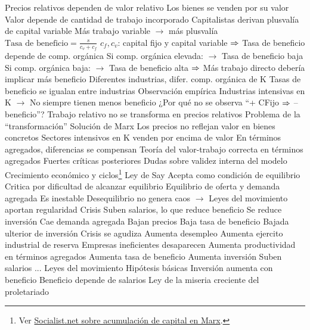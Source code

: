 \documentclass{nuevotema}
\begin{document}
\begin{esquemal}
				\4[i] Precios relativos dependen de valor relativo
				\4[] Los bienes se venden por su valor
				\4[] Valor depende de cantidad de trabajo incorporado
				\4[ii] Capitalistas derivan plusvalía de capital variable
				\4[] Más trabajo variable $\to$ más plusvalía
				\4[] $\text{Tasa de beneficio} = \frac{s}{c_v+c_f}$
				\4[] $c_f, c_v$: capital fijo y capital variable
				\4[] $\then$ Tasa de beneficio depende de comp. orgánica
				\4[] Si comp. orgánica elevada:
				\4[] $\to$ Tasa de beneficio baja
				\4[] Si comp. orgánica baja:
				\4[] $\to$ Tasa de beneficio alta
				\4[] $\then$ Más trabajo directo debería implicar más beneficio
				\4[iii] Diferentes industrias, difer. comp. orgánica de K
				\4[iv] Tasas de beneficio se igualan entre industrias
				\4[] Observación empírica
				\4[] Industrias intensivas en K
				\4[] $\to$ No siempre tienen menos beneficio
				\4[$\to$] ¿Por qué no se observa ``+ CFijo $\then$ -- beneficio''?
				\4[$\then$] Trabajo relativo no se transforma en precios relativos
				\4[$\then$] Problema de la ``transformación''
				\4 Solución de Marx
				\4[] Los precios no reflejan valor en bienes concretos
				\4[] Sectores intensivos en K venden por encima de valor
				\4[] En términos agregados, diferencias se compensan
				\4[] Teoría del valor-trabajo correcta en términos agregados
				\4 Fuertes críticas posteriores
				\4[] Dudas sobre validez interna del modelo
		\2 Crecimiento económico y ciclos\footnote{Ver \href{https://www.socialist.net/marx-s-capital-chapters-23-25-accumulation.htm}{Socialist.net sobre acumulación de capital en Marx}.}
			\3 Ley de Say
				\4 Acepta como condición de equilibrio
				\4 Critica por dificultad de alcanzar equilibrio
				\4 Equilibrio de oferta y demanda agregada
				\4[] Es inestable
				\4 Desequilibrio no genera caos
				\4[] $\to$ Leyes del movimiento aportan regularidad
			\3 Crisis
				\4[1] Suben salarios, lo que reduce beneficio
				\4[2] Se reduce inversión
				\4[3] Cae demanda agregada
				\4[4] Bajan precios
				\4[5] Baja tasa de beneficio
				\4[6] Bajada ulterior de inversión
				\4[7] Crisis se agudiza
				\4[8] Aumenta desempleo
				\4[9] Aumenta ejercito industrial de reserva
				\4[10] Empresas ineficientes desaparecen
				\4[11] Aumenta productividad en términos agregados
				\4[12] Aumenta tasa de beneficio
				\4[13] Aumenta inversión
				\4[1] Suben salarios
				\4[] ...
			\3 Leyes del movimiento
				\4 Hipótesis básicas
				\4[] Inversión aumenta con beneficio
				\4[] Beneficio depende de salarios
				\4[i] Ley de la miseria creciente del proletariado

\end{esquemal}
\end{document}
